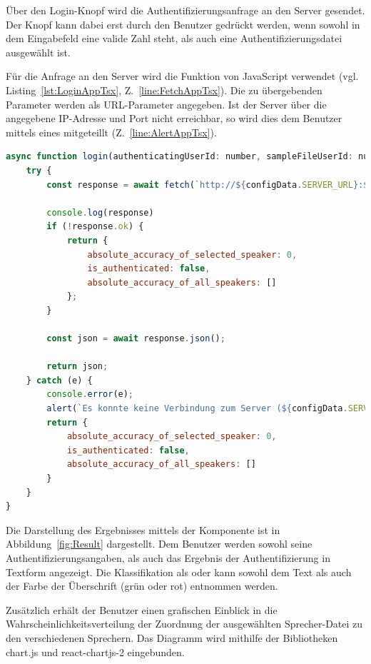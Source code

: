 Über den Login-Knopf wird die Authentifizierungsanfrage an den Server gesendet.
Der Knopf kann dabei erst durch den Benutzer gedrückt werden, wenn sowohl in dem Eingabefeld eine valide Zahl steht, als auch eine Authentifizierungsdatei ausgewählt ist.

Für die Anfrage an den Server wird die  Funktion von JavaScript verwendet (vgl. Listing~\ref{lst:LoginAppTsx}, Z.~\ref{line:FetchAppTsx}).
Die zu übergebenden Parameter werden als URL-Parameter angegeben.
Ist der Server über die angegebene IP-Adresse und Port nicht erreichbar, so wird dies dem Benutzer mittels eines  mitgeteillt (Z.~\ref{line:AlertAppTsx}).
\begin{lstlisting}[language=JavaScript,caption=login() - App.tsx,label=lst:LoginAppTsx]
async function login(authenticatingUserId: number, sampleFileUserId: number, sampleFileIndex: number) {
    try {
        const response = await fetch(`http://${configData.SERVER_URL}:${configData.SERVER_PORT}/?speaker_id=${sampleFileUserId}&sample_id=${sampleFileIndex}&selected_speaker_id=${authenticatingUserId}`); //(*@\label{line:FetchAppTsx}@*)
    
        console.log(response)
        if (!response.ok) {
            return { 
                absolute_accuracy_of_selected_speaker: 0,
                is_authenticated: false,
                absolute_accuracy_of_all_speakers: []
            };
        }
    
        const json = await response.json();
        
        return json;
    } catch (e) {
        console.error(e);
        alert(`Es konnte keine Verbindung zum Server (${configData.SERVER_URL}:${configData.SERVER_PORT}) hergestellt werden!`) //(*@\label{line:AlertAppTsx}@*)
        return {
            absolute_accuracy_of_selected_speaker: 0,
            is_authenticated: false,
            absolute_accuracy_of_all_speakers: []
        }
    }
}
\end{lstlisting}

Die Darstellung des Ergebnisses mittels der  Komponente ist in Abbildung~\ref{fig:Result} dargestellt.
Dem Benutzer werden sowohl seine Authentifizierungsangaben, als auch das Ergebnis der Authentifizierung in Textform angezeigt.
Die Klassifikation als  oder  kann sowohl dem Text als auch der Farbe der Überschrift (grün oder rot) entnommen werden.

Zusätzlich erhält der Benutzer einen grafischen Einblick in die Wahrscheinlichkeitsverteilung der Zuordnung der ausgewählten Sprecher-Datei zu den verschiedenen Sprechern.
Das Diagramm wird mithilfe der Bibliotheken chart.js und react-chartjs-2 eingebunden.

